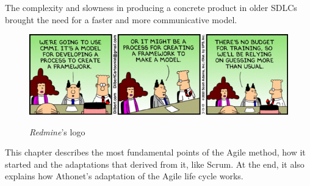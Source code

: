 The complexity and slowness in producing a concrete product in older SDLCs brought the need for a faster and more communicative model.\\
\begin{figure}[H]
	\centering
	\includegraphics[width=\textwidth]{resources/BffFTn_CAAAEvGn}\\
	\caption{\textit{Redmine}'s logo}
\end{figure}
This chapter describes the most fundamental points of the Agile method, how it started and the adaptations that derived from it, like Scrum.
At the end, it also explains how Athonet's adaptation of the Agile life cycle works.

